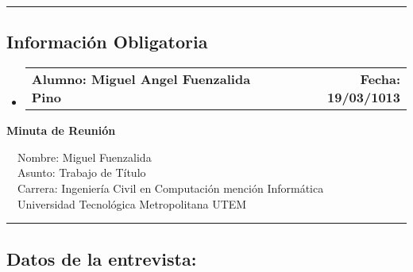 \documentclass[10pt,letterpaper]{article}
\makeatletter
\newcommand{\headerrow}[2]
{\begin{tabular*}{\linewidth}{l@{\extracolsep{\fill}}r}
	#1 &
	#2 \\
\end{tabular*}}
\makeatother
\begin{document}
\hrule
\vspace{-0.4em}
\subsection*{Información Obligatoria}

\begin{itemize}
	\parskip=0.1em

	\item 
	\headerrow
		{\textbf{Alumno: Miguel Angel Fuenzalida Pino}}
		{\textbf{Fecha: 19/03/1013}}

\end{itemize}
\newpage
\begin{center}
{\LARGE \textbf{Minuta de Reunión}}

\ \ \textbullet Nombre: Miguel Fuenzalida
\\
\ \ \textbullet Asunto: Trabajo de Título
\\
\ \ \textbullet Carrera: Ingeniería Civil en Computación mención Informática
\\
\ \ \textbullet Universidad Tecnológica Metropolitana UTEM
\end{center}

\hrule
\vspace{-0.4em}
\subsection*{Datos de la entrevista:}
\end{document}
